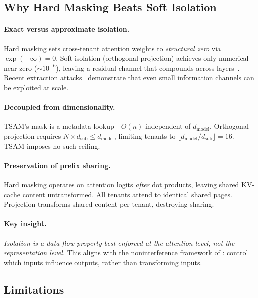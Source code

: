\documentclass[11pt]{article}
\begin{document}
\subsection{Why Hard Masking Beats Soft Isolation}

\paragraph{Exact versus approximate isolation.}
Hard masking sets cross-tenant attention weights to \emph{structural zero} via $\exp(-\infty) = 0$. Soft isolation (orthogonal projection) achieves only numerical near-zero ($\sim 10^{-6}$), leaving a residual channel that compounds across layers~\citep{li2024orthogonal}. Recent extraction attacks~\citep{carlini2021extracting, nasr2023scalable} demonstrate that even small information channels can be exploited at scale.

\paragraph{Decoupled from dimensionality.}
TSAM's mask is a metadata lookup---$O(n)$ independent of $d_{\mathrm{model}}$. Orthogonal projection requires $N \times d_{\mathrm{sub}} \leq d_{\mathrm{model}}$, limiting tenants to $\lfloor d_{\mathrm{model}}/d_{\mathrm{sub}} \rfloor = 16$. TSAM imposes no such ceiling.

\paragraph{Preservation of prefix sharing.}
Hard masking operates on attention logits \emph{after} dot products, leaving shared KV-cache content untransformed. All tenants attend to identical shared pages. Projection transforms shared content per-tenant, destroying sharing.

\paragraph{Key insight.} \emph{Isolation is a data-flow property best enforced at the attention level, not the representation level.} This aligns with the noninterference framework of \citet{goguen1982security}: control which inputs influence outputs, rather than transforming inputs.

\subsection{Limitations}
\label{sec:limitations}
\end{document}
